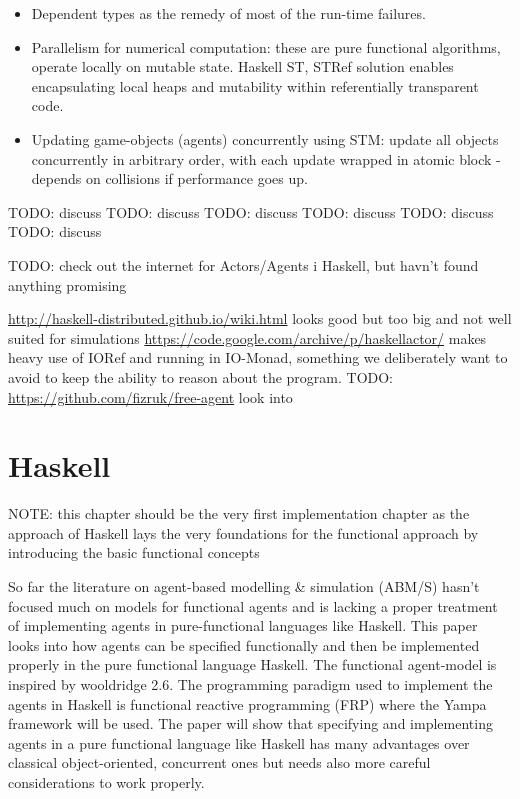 \begin{itemize}
\item Dependent types as the remedy of most of the run-time failures.
\item Parallelism for numerical computation: these are pure functional algorithms, operate locally on mutable state. Haskell ST, STRef solution enables encapsulating local heaps and mutability within referentially transparent code.
\item Updating game-objects (agents) concurrently using STM: update all objects concurrently in arbitrary order, with each update wrapped in atomic block - depends on collisions if performance goes up.
\end{itemize}

TODO: discuss \cite{schneider_towards_2012}
TODO: discuss \cite{vendrov_frabjous:_2014}
TODO: discuss \cite{sulzmann_specifying_2007}
TODO: discuss \cite{jankovic_functional_2007}
TODO: discuss \cite{de_jong_suitability_2014}
TODO: discuss \cite{sorokin_aivika_2015}

TODO: check out the internet for Actors/Agents i Haskell, but havn't found anything promising

\url{http://haskell-distributed.github.io/wiki.html} looks good but too big and not well suited for simulations
\url{https://code.google.com/archive/p/haskellactor/} makes heavy use of IORef and running in IO-Monad, something we deliberately want to avoid to keep the ability to reason about the program.
TODO: \url{https://github.com/fizruk/free-agent} look into


\chapter{Haskell} 
NOTE: this chapter should be the very first implementation chapter as the approach of Haskell lays the very foundations for the functional approach by introducing the basic functional concepts

So far the literature on agent-based modelling \& simulation (ABM/S) hasn't focused much on models for functional agents and is lacking a proper treatment of implementing agents in pure-functional languages like Haskell. This paper looks into how agents can be specified functionally and then be implemented properly in the pure functional language Haskell. The functional agent-model is inspired by wooldridge 2.6. The programming paradigm used to implement the agents in Haskell is functional reactive programming (FRP) where the Yampa framework will be used. The paper will show that specifying and implementing agents in a pure functional language like Haskell has many advantages over classical object-oriented, concurrent ones but needs also more careful considerations to work properly.

